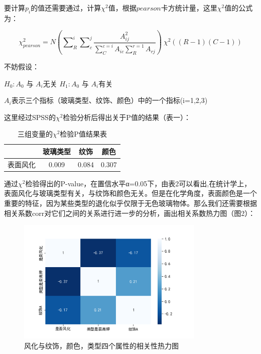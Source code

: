 \documentclass[withoutpreface,bwprint]{cumcmthesis}%
\begin{document}
	要计算$p_{i}$的值还需要通过，计算$\chi^{2}$值，根据$pearson$卡方统计量，这里$\chi^{2}$值的公式为：
	
	\begin{equation}
		\chi^{2}_{pearson} = N\left(\sum\nolimits_{R}^{i}  \sum\nolimits_{c}^{j} \frac{A_{ij}^{2}}{\sum\nolimits_{C}^{c=i}A_{ic} \sum\nolimits_{R}^{r=1}A_{rj}}	\right) ~ \chi^{2}((R-1)(C-1))
	\end{equation}
	
	不妨假设：
	
	\centerline{\large{$H_{0}:A_{0}$ 与 $A_{i}$无关 \quad  $H_{1}:A_{0}$ 与 $A_{i}$有关}}
	
	\centerline{\large{$A_{i}$表示三个指标（玻璃类型、纹饰、颜色）中的一个指标(i=1,2,3)}}
	
	
	这里经过SPSS的$\chi^{2}$检验分析后得出关于P值的结果（表一）：
	
	\begin{table}[!htb]
		\centering
		\caption{三组变量的$\chi^{2}$检验P值结果表}
		\begin{tabular}{c|c|c|c}
			\hline
			 & 玻璃类型 & 纹饰 & 颜色\\
			\hline
			表面风化 & 0.009 & 0.084 & 0.307\\
			\hline
		\end{tabular}
	\end{table}

	通过$\chi^{2}$检验得出的P-value，在置信水平α=0.05下，由表2可以看出,在统计学上，表面风化与玻璃类型有关，与纹饰和颜色无关。但是在化学角度，表面颜色是一个重要的特征，因为某些类型的退化似乎仅限于无色玻璃物体。那么我们还需要根据相关系数corr对它们之间的关系进行进一步的分析，画出相关系数热力图（图2）： 
	
	\newpage
	\begin{figure}[!h]
		\centering
		\includegraphics[width=0.8\textwidth]{ph2}
		\caption{风化与纹饰，颜色，类型四个属性的相关性热力图}
		\label{fig:ph2}
	\end{figure}
	
\end{document}
